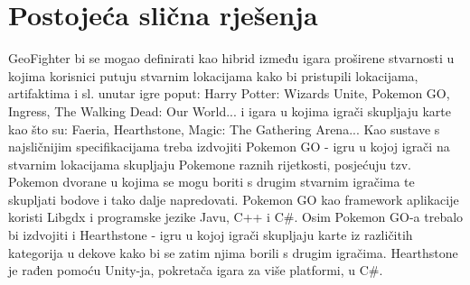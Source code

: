 		\section{Postojeća slična rješenja}
		
		{GeoFighter bi se mogao definirati kao hibrid između igara proširene stvarnosti u kojima korisnici putuju stvarnim lokacijama kako bi pristupili lokacijama, artifaktima i sl. unutar igre poput: Harry Potter: Wizards Unite, Pokemon GO, Ingress, The Walking Dead: Our World... i igara u kojima igrači skupljaju karte kao što su: Faeria, Hearthstone, Magic: The Gathering Arena... Kao sustave s najsličnijim specifikacijama treba izdvojiti Pokemon GO - igru u kojoj igrači na stvarnim lokacijama skupljaju Pokemone raznih rijetkosti, posjećuju tzv. Pokemon dvorane u kojima se mogu boriti s drugim stvarnim igračima te skupljati bodove i tako dalje napredovati. Pokemon GO kao framework aplikacije koristi Libgdx i programske jezike Javu, C++ i C\#. Osim Pokemon GO-a trebalo bi izdvojiti i Hearthstone - igru u kojoj igrači skupljaju karte iz različitih kategorija u dekove kako bi se zatim njima borili s drugim igračima. Hearthstone je rađen pomoću Unity-ja, pokretača igara za više platformi, u  C\#.  }
		\eject
	
